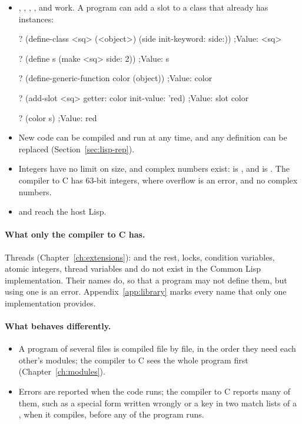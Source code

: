 \begin{itemize}
\item {}, , ,
  ,  and
   work. A program can add a
  slot to a class that already has instances:
\begin{repl}
? (define-class <sq> (<object>) (side init-keyword: side:))
;Value: <sq>

? (define s (make <sq> side: 2))
;Value: s

? (define-generic-function color (object))
;Value: color

? (add-slot <sq> getter: color init-value: 'red)
;Value: {slot color}

? (color s)
;Value: red
\end{repl}
\item New code can be compiled and run at any time, and any definition
  can be replaced (Section~\ref{sec:lisp-rep}).
\item Integers have no limit on size, and complex numbers exist:
   is ,
  and  is . The compiler to C has
  63-bit integers, where overflow is an error, and no complex numbers.
\item {} and  reach the host
  Lisp.
\end{itemize}

\paragraph{What only the compiler to C has.}
Threads (Chapter~\ref{ch:extensions}):  and the
rest, locks, condition variables, atomic integers, thread variables and
 do not exist in the Common Lisp implementation. Their
names do, so that a program may not define them, but using one is an
error.
Appendix~\ref{app:library} marks every name that only one
implementation provides.

\paragraph{What behaves differently.}

\begin{itemize}
\item A program of several files is compiled file by file, in the order
  they need each other's modules; the compiler to C sees the whole
  program first (Chapter~\ref{ch:modules}).
\item Errors are reported when the code runs; the compiler to C reports
  many of them, such as a special form written wrongly or a key in two
  match lists of a , when it compiles, before any of the
  program runs.
\end{itemize}

